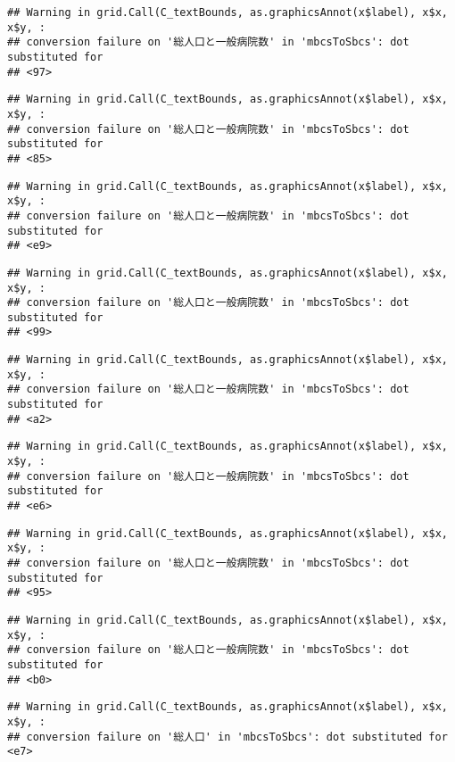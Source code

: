 \documentclass[
]{article}
\begin{document}
\begin{verbatim}
## Warning in grid.Call(C_textBounds, as.graphicsAnnot(x$label), x$x, x$y, :
## conversion failure on '総人口と一般病院数' in 'mbcsToSbcs': dot substituted for
## <97>
\end{verbatim}

\begin{verbatim}
## Warning in grid.Call(C_textBounds, as.graphicsAnnot(x$label), x$x, x$y, :
## conversion failure on '総人口と一般病院数' in 'mbcsToSbcs': dot substituted for
## <85>
\end{verbatim}

\begin{verbatim}
## Warning in grid.Call(C_textBounds, as.graphicsAnnot(x$label), x$x, x$y, :
## conversion failure on '総人口と一般病院数' in 'mbcsToSbcs': dot substituted for
## <e9>
\end{verbatim}

\begin{verbatim}
## Warning in grid.Call(C_textBounds, as.graphicsAnnot(x$label), x$x, x$y, :
## conversion failure on '総人口と一般病院数' in 'mbcsToSbcs': dot substituted for
## <99>
\end{verbatim}

\begin{verbatim}
## Warning in grid.Call(C_textBounds, as.graphicsAnnot(x$label), x$x, x$y, :
## conversion failure on '総人口と一般病院数' in 'mbcsToSbcs': dot substituted for
## <a2>
\end{verbatim}

\begin{verbatim}
## Warning in grid.Call(C_textBounds, as.graphicsAnnot(x$label), x$x, x$y, :
## conversion failure on '総人口と一般病院数' in 'mbcsToSbcs': dot substituted for
## <e6>
\end{verbatim}

\begin{verbatim}
## Warning in grid.Call(C_textBounds, as.graphicsAnnot(x$label), x$x, x$y, :
## conversion failure on '総人口と一般病院数' in 'mbcsToSbcs': dot substituted for
## <95>
\end{verbatim}

\begin{verbatim}
## Warning in grid.Call(C_textBounds, as.graphicsAnnot(x$label), x$x, x$y, :
## conversion failure on '総人口と一般病院数' in 'mbcsToSbcs': dot substituted for
## <b0>
\end{verbatim}

\begin{verbatim}
## Warning in grid.Call(C_textBounds, as.graphicsAnnot(x$label), x$x, x$y, :
## conversion failure on '総人口' in 'mbcsToSbcs': dot substituted for <e7>
\end{verbatim}
\end{document}
